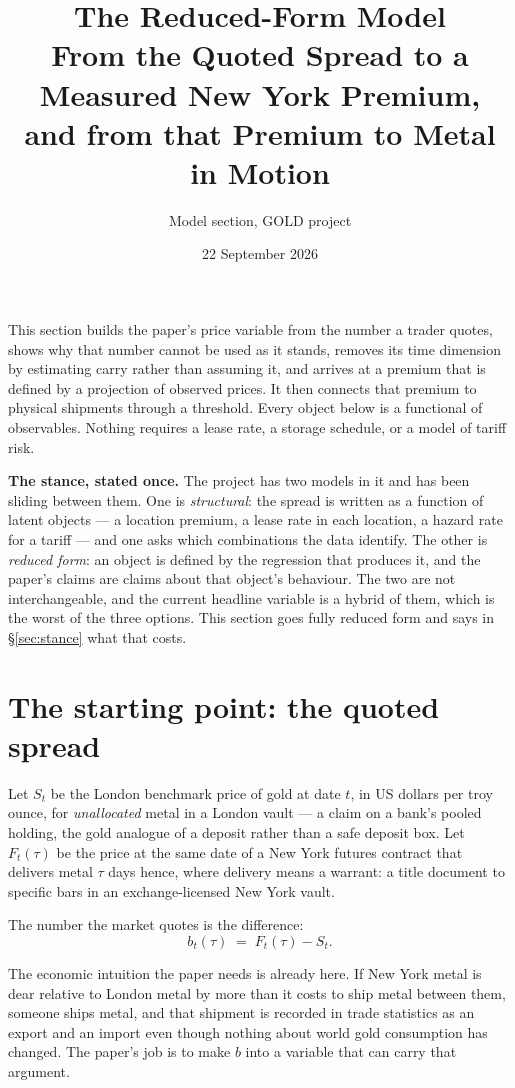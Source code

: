 \documentclass[11pt,a4paper]{article}
\title{\textbf{The Reduced-Form Model}\\[0.4em]
\large From the Quoted Spread to a Measured New York Premium,\\
and from that Premium to Metal in Motion}
\author{Model section, GOLD project}
\date{22 September 2026}
\begin{document}
\maketitle

\noindent
This section builds the paper's price variable from the number a trader
quotes, shows why that number cannot be used as it stands, removes its time
dimension by estimating carry rather than assuming it, and arrives at a
premium that is defined by a projection of observed prices. It then connects
that premium to physical shipments through a threshold. Every object below is
a functional of observables. Nothing requires a lease rate, a storage
schedule, or a model of tariff risk.

\medskip
\noindent\textbf{The stance, stated once.} The project has two models in it and
has been sliding between them. One is \emph{structural}: the spread is written
as a function of latent objects --- a location premium, a lease rate in each
location, a hazard rate for a tariff --- and one asks which combinations the
data identify. The other is \emph{reduced form}: an object is defined by the
regression that produces it, and the paper's claims are claims about that
object's behaviour. The two are not interchangeable, and the current headline
variable is a hybrid of them, which is the worst of the three options. This
section goes fully reduced form and says in \S\ref{sec:stance} what that costs.

\tableofcontents

\section{The starting point: the quoted spread}
\label{sec:start}

Let $S_t$ be the London benchmark price of gold at date $t$, in US dollars per
troy ounce, for \emph{unallocated} metal in a London vault --- a claim on a
bank's pooled holding, the gold analogue of a deposit rather than a safe
deposit box. Let $F_t(\tau)$ be the price at the same date of a New York
futures contract that delivers metal $\tau$ days hence, where delivery means a
warrant: a title document to specific bars in an exchange-licensed New York
vault.

The number the market quotes is the difference:
\begin{equation}
b_t(\tau) \;=\; F_t(\tau) - S_t .
\end{equation}

The economic intuition the paper needs is already here. If New York metal is
dear relative to London metal by more than it costs to ship metal between
them, someone ships metal, and that shipment is recorded in trade statistics
as an export and an import even though nothing about world gold consumption
has changed. The paper's job is to make $b$ into a variable that can carry that
argument.
\end{document}
